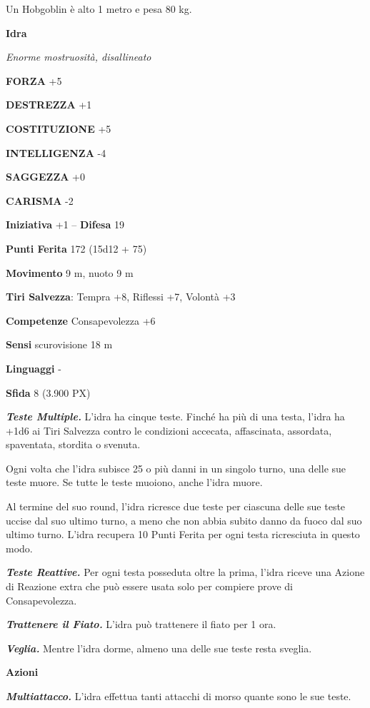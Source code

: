 \begin{multicols}{2}
	Un Hobgoblin è alto 1 metro e pesa 80 kg.


	\medskip{}\textbf{Idra}

	\textit{Enorme mostruosità, disallineato}

	\textbf{FORZA} +5

	\textbf{DESTREZZA} +1

	\textbf{COSTITUZIONE} +5

	\textbf{INTELLIGENZA} -4

	\textbf{SAGGEZZA} +0

	\textbf{CARISMA} -2

	\textbf{Iniziativa} +1 -- \textbf{Difesa} 19

	\textbf{Punti Ferita} 172 (15d12 + 75)

	\textbf{Movimento} 9 m, nuoto 9 m

	\textbf{Tiri Salvezza}: Tempra +8, Riflessi +7, Volontà +3

	\textbf{Competenze} Consapevolezza +6

	\textbf{Sensi} scurovisione 18 m

	\textbf{Linguaggi} -

	\textbf{Sfida} 8 (3.900 PX)

	\textit{\textbf{Teste Multiple.}} L'idra ha cinque teste. Finché ha più di una testa, l'idra ha +1d6 ai Tiri Salvezza contro le condizioni accecata, affascinata, assordata, spaventata, stordita o svenuta.

	Ogni volta che l'idra subisce 25 o più danni in un singolo turno, una delle sue teste muore. Se tutte le teste muoiono, anche l'idra muore.

	Al termine del suo round, l'idra ricresce due teste per ciascuna delle sue teste uccise dal suo ultimo turno, a meno che non abbia subito danno da fuoco dal suo ultimo turno. L'idra recupera 10 Punti Ferita per ogni testa ricresciuta in questo modo.

	\textit{\textbf{Teste Reattive.}} Per ogni testa posseduta oltre la prima, l'idra riceve una Azione di Reazione extra che può essere usata solo per compiere prove di Consapevolezza.

	\textit{\textbf{Trattenere il Fiato.}} L'idra può trattenere il fiato per 1 ora.

	\textit{\textbf{Veglia.}} Mentre l'idra dorme, almeno una delle sue teste resta sveglia.

	\textbf{Azioni}

	\textit{\textbf{Multiattacco.}} L'idra effettua tanti attacchi di morso quante sono le sue teste.


\end{multicols}
